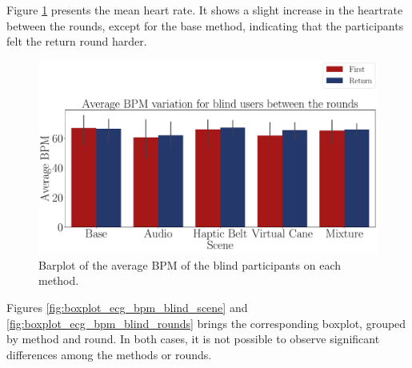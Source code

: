 

Figure \ref{fig:barplot_ecg_bpm_5_scene_blind} presents the mean heart rate. It shows a slight increase in the heartrate between the rounds, except for the base method, indicating that the participants felt the return round harder.

\begin{figure}[!htb]
    \centering
    \includegraphics[width = \textwidth]{Resultados/ECG/Figuras/pdf/barplot_ecg_bpm_5_scene_blind.pdf}
    \caption{Barplot of the average BPM of the blind participants on each method.}
    \label{fig:barplot_ecg_bpm_5_scene_blind}
\end{figure}

% 
%

Figures \ref{fig:boxplot_ecg_bpm_blind_scene} and \ref{fig:boxplot_ecg_bpm_blind_rounds} brings the corresponding boxplot, grouped by method and round. In both cases, it is not possible to observe significant differences among the methods or rounds.

